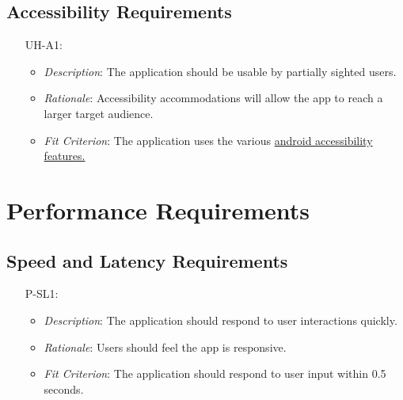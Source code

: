 \documentclass[12pt]{article}
\begin{document}
\subsection{Accessibility Requirements}
\noindent \begin{itemize}
    \item[UH-A1:] 
        \begin{itemize}
            \item \textit{Description}: The application should be usable by partially sighted users.
            \item \textit{Rationale}: Accessibility accommodations will allow the app to reach a larger target audience.
            \item \textit{Fit Criterion}: The application uses the various \href{https://support.google.com/accessibility/android/answer/6006564?hl=en}{android accessibility features.}
        \end{itemize}
\end{itemize}

\section{Performance Requirements}
\subsection{Speed and Latency Requirements}
\noindent \begin{itemize}
    \item[P-SL1:] 
        \begin{itemize}
            \item \textit{Description}: The application should respond to user interactions quickly.
            \item \textit{Rationale}: Users should feel the app is responsive.
            \item \textit{Fit Criterion}: The application should respond to user input within 0.5 seconds.
        \end{itemize}
\end{itemize}


\end{document}

